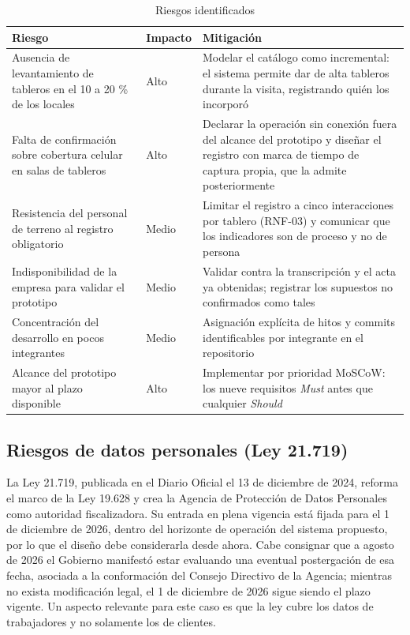 \documentclass[10pt,letterpaper]{article}
\begin{document}
\begin{table}[H]
\centering
\small
\begin{tabular}{@{}p{5.5cm}p{2cm}p{6.5cm}@{}}
\toprule
\textbf{Riesgo} & \textbf{Impacto} & \textbf{Mitigación} \\
\midrule
Ausencia de levantamiento de tableros en el 10 a 20 \% de los locales & Alto & Modelar el catálogo como incremental: el sistema permite dar de alta tableros durante la visita, registrando quién los incorporó \\
Falta de confirmación sobre cobertura celular en salas de tableros & Alto & Declarar la operación sin conexión fuera del alcance del prototipo y diseñar el registro con marca de tiempo de captura propia, que la admite posteriormente \\
Resistencia del personal de terreno al registro obligatorio & Medio & Limitar el registro a cinco interacciones por tablero (RNF-03) y comunicar que los indicadores son de proceso y no de persona \\
Indisponibilidad de la empresa para validar el prototipo & Medio & Validar contra la transcripción y el acta ya obtenidas; registrar los supuestos no confirmados como tales \\
Concentración del desarrollo en pocos integrantes & Medio & Asignación explícita de hitos y commits identificables por integrante en el repositorio \\
Alcance del prototipo mayor al plazo disponible & Alto & Implementar por prioridad MoSCoW: los nueve requisitos \emph{Must} antes que cualquier \emph{Should} \\
\bottomrule
\end{tabular}
\caption{Riesgos identificados}
\end{table}

\subsection{Riesgos de datos personales (Ley 21.719)}

La Ley 21.719, publicada en el Diario Oficial el 13 de diciembre de 2024, reforma el
marco de la Ley 19.628 y crea la Agencia de Protección de Datos Personales como
autoridad fiscalizadora. Su entrada en plena vigencia está fijada para el 1 de
diciembre de 2026, dentro del horizonte de operación del sistema propuesto, por lo que
el diseño debe considerarla desde ahora. Cabe consignar que a agosto de 2026 el
Gobierno manifestó estar evaluando una eventual postergación de esa fecha, asociada a
la conformación del Consejo Directivo de la Agencia; mientras no exista modificación
legal, el 1 de diciembre de 2026 sigue siendo el plazo vigente. Un aspecto relevante
para este caso es que la ley cubre los datos de trabajadores y no solamente los de
clientes.
\end{document}
